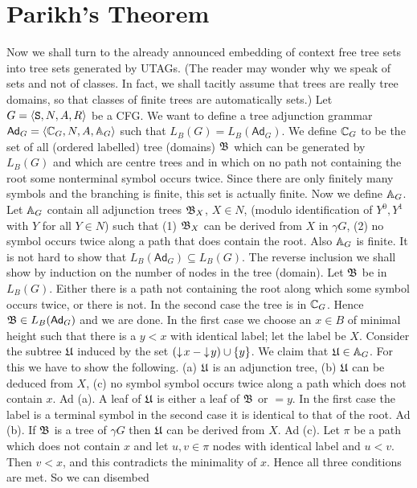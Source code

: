 \section{Parikh's Theorem}
\label{kap2-5}
Now we shall turn to the already announced embedding of context
free tree sets into tree sets generated by UTAGs.
(The reader may wonder why we speak of sets and not
of classes. In fact, we shall tacitly assume that trees are
really tree domains, so that classes of finite trees are automatically
sets.) Let $G = \langle \mbox{\tt S}, N, A, R\rangle$  be a CFG. We
want to define a tree adjunction grammar $\mathsf{Ad}_G =
\langle \mathbb{C}_G, N, A, \mathbb{A}_G\rangle$ such that $L_B(G) = L_B(\mathsf{Ad}_G)$.
We define $\mathbb{C}_G$ to be the set of all (ordered labelled) tree (domains)
$\mathfrak{B}$ which can be generated by $L_B(G)$ and which are centre trees
and in which on no path not containing the root some nonterminal symbol
occurs twice. Since there are only finitely many symbols and the
branching is finite, this set is actually finite. Now we define
$\mathbb{A}_G$. Let $\mathbb{A}_G$ contain all adjunction trees $\mathfrak{B}_X$, $X \in N$, 
(modulo identification of $Y^0, Y^1$ with $Y$ for all $Y \in N$)
such that (1) $\mathfrak{B}_X$ can be derived from $X$ in $\gamma G$,  
(2) no symbol occurs twice along a path that does contain the root.  
Also $\mathbb{A}_G$ is finite. It is not hard to show that 
$L_B(\mathsf{Ad}_G) \subseteq L_B(G)$. The reverse inclusion 
we shall show by induction on the number of nodes in the tree 
(domain). Let $\mathfrak{B}$ be in $L_B(G)$. Either there is a path
not containing the root along which some symbol occurs twice, or
there is not.  In the second case the tree is in $\mathbb{C}_G$.
Hence $\mathfrak{B} \in L_B(\mathsf{Ad}_G)$ and we are done.
In the first case we choose an $x \in B$ of minimal height such that
there is a $y < x$ with identical label; let the label be $X$.
Consider the subtree $\mathfrak{U}$ induced by the set
$({\downarrow\! x} - {\downarrow\! y}) \cup \{y\}$. We claim that
$\mathfrak{U} \in \mathbb{A}_G$.  For this we have to show the following.
(a) $\mathfrak{U}$ is an adjunction tree, (b) $\mathfrak{U}$ can be deduced from $X$,
(c) no symbol symbol occurs twice along a path  which does not contain
$x$. Ad (a). A leaf of $\mathfrak{U}$ is either a leaf of $\mathfrak{B}$ or $= y$. In
the first case the label is a terminal symbol in the second case
it is identical to that of the root. Ad (b). If $\mathfrak{B}$ is a tree of
$\gamma G$ then $\mathfrak{U}$ can be derived from $X$. Ad (c).
Let $\pi$ be a path which does not contain $x$ and let
$u,v \in \pi$ nodes with identical label and $u < v$.
Then $v < x$, and this contradicts the minimality of
$x$. Hence all three conditions are met.  So we can disembed
